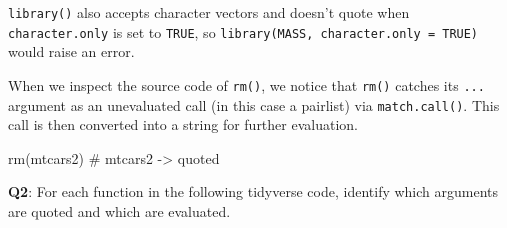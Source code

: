 \documentclass[
]{krantz}
\makeatletter
\newenvironment{Shaded}{\begin{snugshade}}{\end{snugshade}}
\newcommand{\CommentTok}[1]{\textcolor[rgb]{0.56,0.35,0.01}{\textit{#1}}}
\newcommand{\DataTypeTok}[1]{\textcolor[rgb]{0.13,0.29,0.53}{#1}}
\newcommand{\DecValTok}[1]{\textcolor[rgb]{0.00,0.00,0.81}{#1}}
\newcommand{\KeywordTok}[1]{\textcolor[rgb]{0.13,0.29,0.53}{\textbf{#1}}}
\newcommand{\NormalTok}[1]{#1}
\newcommand{\OperatorTok}[1]{\textcolor[rgb]{0.81,0.36,0.00}{\textbf{#1}}}
\newcommand{\StringTok}[1]{\textcolor[rgb]{0.31,0.60,0.02}{#1}}
\newenvironment{kframe}{%
\medskip{}
\setlength{\fboxsep}{.8em}
 \def\at@end@of@kframe{}%
 \ifinner\ifhmode%
  \def\at@end@of@kframe{\end{minipage}}%
  \begin{minipage}{\columnwidth}%
 \fi\fi%
 \def\FrameCommand##1{\hskip\@totalleftmargin \hskip-\fboxsep
 \colorbox{shadecolor}{##1}\hskip-\fboxsep
     \hskip-\linewidth \hskip-\@totalleftmargin \hskip\columnwidth}%
 \MakeFramed {\advance\hsize-\width
   \@totalleftmargin\z@ \linewidth\hsize
   \@setminipage}}%
 {\par\unskip\endMakeFramed%
 \at@end@of@kframe}
\renewenvironment{Shaded}{\begin{kframe}}{\end{kframe}}
\renewcommand{\KeywordTok} [1]{\textcolor[rgb]{0.00,0.44,0.13}{{#1}}}
\renewcommand{\DataTypeTok}[1]{\textcolor[rgb]{0.56,0.13,0.00}{{#1}}}
\renewcommand{\DecValTok}  [1]{\textcolor[rgb]{0.25,0.63,0.44}{{#1}}}
\renewcommand{\StringTok}  [1]{\textcolor[rgb]{0.25,0.44,0.63}{{#1}}}
\renewcommand{\CommentTok} [1]{\textcolor[rgb]{0.38,0.63,0.69}{{#1}}}
\renewcommand{\NormalTok}  [1]{{#1}}
\makeatother
\begin{document}
\texttt{library()} also accepts character vectors and doesn't quote when \texttt{character.only} is set to \texttt{TRUE}, so \texttt{library(MASS,\ character.only\ =\ TRUE)} would raise an error.

\begin{Shaded}
\end{Shaded}

When we inspect the source code of \texttt{rm()}, we notice that \texttt{rm()} catches its \texttt{...} argument as an unevaluated call (in this case a pairlist) via \texttt{match.call()}. This call is then converted into a string for further evaluation.

\begin{Shaded}
\begin{Highlighting}[]
\KeywordTok{rm}\NormalTok{(mtcars2)  }\CommentTok{# mtcars2 -> quoted}
\end{Highlighting}
\end{Shaded}

\textbf{{Q2}}: For each function in the following tidyverse code, identify which arguments are quoted and which are evaluated.

\begin{Shaded}
\end{Shaded}
\end{document}
